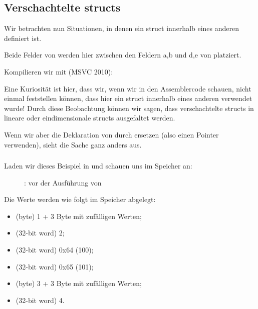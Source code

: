 \subsection{Verschachtelte structs}
Wir betrachten nun Situationen, in denen ein struct innerhalb eines anderen definiert ist.


Beide Felder von  werden hier zwischen den Feldern a,b und d,e von  platziert.

Kompilieren wir mit (MSVC 2010):


Eine Kuriosität ist hier, dass wir, wenn wir in den Assemblercode schauen, nicht einmal feststellen können, dass hier
ein struct innerhalb eines anderen verwendet wurde! Durch diese Beobachtung können wir sagen, dass verschachtelte
structs in lineare oder eindimensionale structs ausgefaltet werden.

Wenn wir aber die Deklaration von  durch  ersetzen (also einen
Pointer verwenden), sieht die Sache ganz anders aus.

\clearpage
\subsubsection{\olly}
\myindex{\olly}
Laden wir dieses Beispiel in \olly und schauen uns  im Speicher an:

\begin{figure}[H]
\centering
{}
\caption{\olly: vor der Ausführung von \printf}
\label{fig:nested_olly}
\end{figure}
Die Werte werden wie folgt im Speicher abgelegt:
\begin{itemize}
\item {} (byte) 1 + 3 Byte mit zufälligen Werten;
\item {} (32-bit word) 2;
\item {} (32-bit word) 0x64 (100);
\item {} (32-bit word) 0x65 (101);
\item {} (byte) 3 + 3 Byte mit zufälligen Werten;
\item {} (32-bit word) 4.
\end{itemize}

